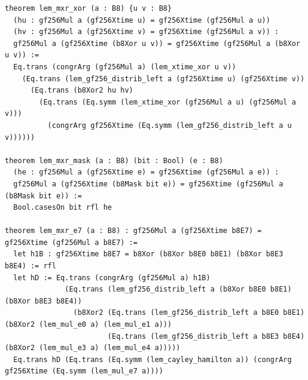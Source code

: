 \documentclass[10pt,twocolumn]{article}
\theoremstyle{spectralthm}
\begin{document}
\begin{lstlisting}[language=Lean4,caption={Standalone Pure Init.Prelude Term-Mode Lean 4 Expansion (thm30--thm37, v1.1.0, 0 sorry, 0 axioms).},label={lst:lean_v110}]
theorem lem_mxr_xor (a : B8) {u v : B8}
  (hu : gf256Mul a (gf256Xtime u) = gf256Xtime (gf256Mul a u))
  (hv : gf256Mul a (gf256Xtime v) = gf256Xtime (gf256Mul a v)) :
  gf256Mul a (gf256Xtime (b8Xor u v)) = gf256Xtime (gf256Mul a (b8Xor u v)) :=
  Eq.trans (congrArg (gf256Mul a) (lem_xtime_xor u v))
    (Eq.trans (lem_gf256_distrib_left a (gf256Xtime u) (gf256Xtime v))
      (Eq.trans (b8Xor2 hu hv)
        (Eq.trans (Eq.symm (lem_xtime_xor (gf256Mul a u) (gf256Mul a v)))
          (congrArg gf256Xtime (Eq.symm (lem_gf256_distrib_left a u v))))))

theorem lem_mxr_mask (a : B8) (bit : Bool) (e : B8)
  (he : gf256Mul a (gf256Xtime e) = gf256Xtime (gf256Mul a e)) :
  gf256Mul a (gf256Xtime (b8Mask bit e)) = gf256Xtime (gf256Mul a (b8Mask bit e)) :=
  Bool.casesOn bit rfl he

theorem lem_mxr_e7 (a : B8) : gf256Mul a (gf256Xtime b8E7) = gf256Xtime (gf256Mul a b8E7) :=
  let h1B : gf256Xtime b8E7 = b8Xor (b8Xor b8E0 b8E1) (b8Xor b8E3 b8E4) := rfl
  let hD := Eq.trans (congrArg (gf256Mul a) h1B)
              (Eq.trans (lem_gf256_distrib_left a (b8Xor b8E0 b8E1) (b8Xor b8E3 b8E4))
                (b8Xor2 (Eq.trans (lem_gf256_distrib_left a b8E0 b8E1) (b8Xor2 (lem_mul_e0 a) (lem_mul_e1 a)))
                        (Eq.trans (lem_gf256_distrib_left a b8E3 b8E4) (b8Xor2 (lem_mul_e3 a) (lem_mul_e4 a)))))
  Eq.trans hD (Eq.trans (Eq.symm (lem_cayley_hamilton a)) (congrArg gf256Xtime (Eq.symm (lem_mul_e7 a))))


\end{lstlisting}
\end{document}
